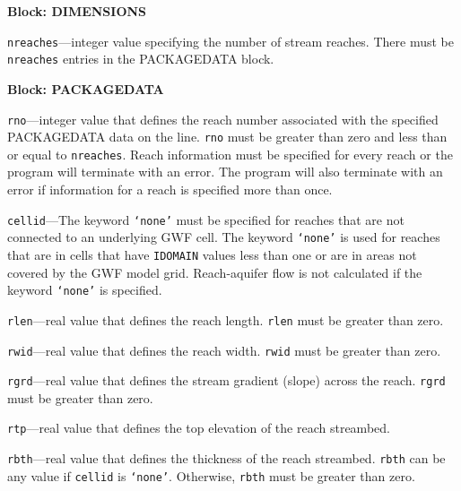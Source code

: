 \item \textbf{Block: DIMENSIONS}

\begin{description}
\item \texttt{nreaches}---integer value specifying the number of stream reaches.  There must be \texttt{nreaches} entries in the PACKAGEDATA block.

\end{description}
\item \textbf{Block: PACKAGEDATA}

\begin{description}
\item \texttt{rno}---integer value that defines the reach number associated with the specified PACKAGEDATA data on the line. \texttt{rno} must be greater than zero and less than or equal to \texttt{nreaches}. Reach information must be specified for every reach or the program will terminate with an error.  The program will also terminate with an error if information for a reach is specified more than once.

\item \texttt{cellid}---The keyword \texttt{`none'} must be specified for reaches that are not connected to an underlying GWF cell. The keyword \texttt{`none'} is used for reaches that are in cells that have \texttt{IDOMAIN} values less than one or are in areas not covered by the GWF model grid. Reach-aquifer flow is not calculated if the keyword \texttt{`none'} is specified.

\item \texttt{rlen}---real value that defines the reach length. \texttt{rlen} must be greater than zero.

\item \texttt{rwid}---real value that defines the reach width. \texttt{rwid} must be greater than zero.

\item \texttt{rgrd}---real value that defines the stream gradient (slope) across the reach. \texttt{rgrd} must be greater than zero.

\item \texttt{rtp}---real value that defines the top elevation of the reach streambed.

\item \texttt{rbth}---real value that defines the thickness of the reach streambed. \texttt{rbth} can be any value if \texttt{cellid} is \texttt{`none'}. Otherwise, \texttt{rbth} must be greater than zero.


\end{description}
